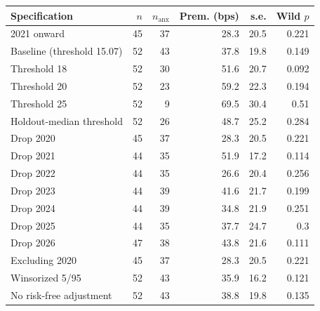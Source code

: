 \begin{tabular}{lrrrrr}\toprule
Specification & $n$ & $n_{\mathrm{anx}}$ & Prem. (bps) & s.e. & Wild $p$ \\ \midrule
2021 onward & 45 & 37 & 28.3 & 20.5 & 0.221 \\
Baseline (threshold 15.07) & 52 & 43 & 37.8 & 19.8 & 0.149 \\
Threshold 18 & 52 & 30 & 51.6 & 20.7 & 0.092 \\
Threshold 20 & 52 & 23 & 59.2 & 22.3 & 0.194 \\
Threshold 25 & 52 & 9 & 69.5 & 30.4 & 0.51 \\
Holdout-median threshold & 52 & 26 & 48.7 & 25.2 & 0.284 \\
Drop 2020 & 45 & 37 & 28.3 & 20.5 & 0.221 \\
Drop 2021 & 44 & 35 & 51.9 & 17.2 & 0.114 \\
Drop 2022 & 44 & 35 & 26.6 & 20.4 & 0.256 \\
Drop 2023 & 44 & 39 & 41.6 & 21.7 & 0.199 \\
Drop 2024 & 44 & 39 & 34.8 & 21.9 & 0.251 \\
Drop 2025 & 44 & 35 & 37.7 & 24.7 & 0.3 \\
Drop 2026 & 47 & 38 & 43.8 & 21.6 & 0.111 \\
Excluding 2020 & 45 & 37 & 28.3 & 20.5 & 0.221 \\
Winsorized 5/95 & 52 & 43 & 35.9 & 16.2 & 0.121 \\
No risk-free adjustment & 52 & 43 & 38.8 & 19.8 & 0.135 \\
\bottomrule\end{tabular}